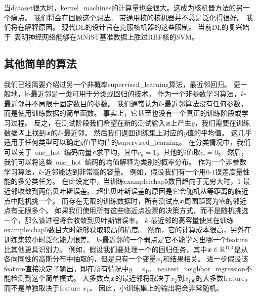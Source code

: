 当\gls{dataset}很大时，\gls{kernel_machines}的计算量也会很大。这成为核机器方法的另一个痛点。
我们将会在回顾这个想法。
带通用核的核机器并不总是泛化得很好。
我们将在解释原因。
现代\gls{DL}的设计旨在克服核机器的这些限制。
当前\gls{DL}的复兴始于~\cite{Hinton06-small}表明神经网络能够在MNIST基准数据上胜过RBF核的\gls{SVM}。


\subsection{其他简单的算法}
\label{sec:other_simple_supervised_learning_algorithms}
我们已经简要介绍过另一个非概率\gls{supervised_learning}算法，最近邻回归。
更一般地，k-最近邻是一类可用于分类或回归的技术。
作为一个非参数学习算法，$k$-最近邻并不局限于固定数目的参数。
我们通常认为$k$-最近邻算法没有任何参数，而是使用训练数据的简单函数。
事实上，它甚至也没有一个真正的训练阶段或学习过程。
反之，在测试阶段我们希望在新的测试输入$\boldsymbol{\mathit{x}}$上产生$y$，我们需要在训练数据$\boldsymbol{\mathit{X}}$上找到$\boldsymbol{\mathit{x}}$的$k$-最近邻。
然后我们返回训练集上对应的$y$值的平均值。
这几乎适用于任何类型可以确定$y$值平均值的\gls{supervised_learning}。
在分类情况中，我们可以关于~\gls{one_hot}~编码向量$\boldsymbol{\mathit{c}}$求平均，其中$c_y = 1$，其他的$i$值取$c_i=0$。
然后，我们可以将这些~\gls{one_hot}~编码的均值解释为类别的概率分布。
作为一个非参数学习算法，$k$-近邻能达到非常高的容量。
例如，假设我们有一个用$0$-$1$误差度量性能的多分类任务。
在此设定中，当训练\gls{example:chap5}数目趋向于无穷大时，$1$-最近邻收敛到两倍贝叶斯误差。
超出贝叶斯误差的原因是它会随机从等距离的临近点中随机挑一个。
而存在无限的训练数据时，所有测试点$\boldsymbol{\mathit{x}}$周围距离为零的邻近点有无限多个。
如果我们使用所有这些临近点投票的决策方式，而不是随机挑选一个，那么该过程将会收敛到贝叶斯错误率。
$k$-最近邻的高容量使其在训练\gls{example:chap5}数目大时能够获取较高的精度。
然而，它的计算成本很高，另外在训练集较小时泛化能力很差。
$k$-最近邻的一个弱点是它不能学习出哪一个\gls{feature}比其他更具识别力。
例如，假设我们要处理一个的回归任务，其中$\boldsymbol{\mathit{x}}\in\mathbb{R}^{100}$是从各向同性的高斯分布中抽取的，但是只有一个变量$x_1$和结果相关。
进一步假设该\gls{feature}直接决定了输出，即在所有情况中$y=x_1$。
\gls{nearest_neighbor_regression}不能检测到这个简单模式。
大多数点$\boldsymbol{\mathit{x}}$的最近邻将取决于$x_2$到$x_{100}$的大多数\gls{feature}，
而不是单独取决于\gls{feature} $x_1$。
因此，小训练集上的输出将会非常随机。


